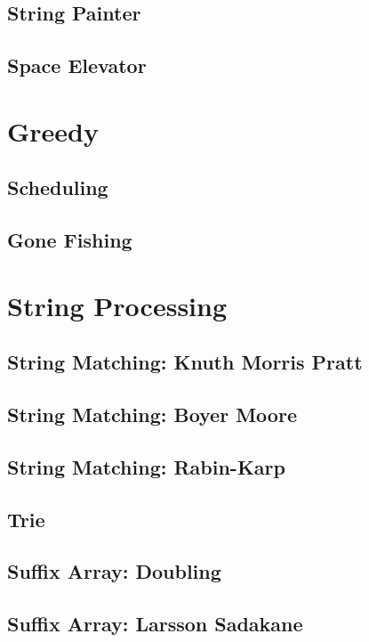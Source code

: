 \documentclass{article}
\begin{document}
    \subsection{String Painter}
        
    \subsection{Space Elevator}
        

\section{Greedy}
    \subsection{Scheduling}
        
    \subsection{Gone Fishing}

\section{String Processing}
    \subsection{String Matching: Knuth Morris Pratt}
        
    \subsection{String Matching: Boyer Moore}
        
    \subsection{String Matching: Rabin-Karp}
    \subsection{Trie}
        
    \subsection{Suffix Array: Doubling}
        
    \subsection{Suffix Array: Larsson Sadakane}
        
\end{document}
